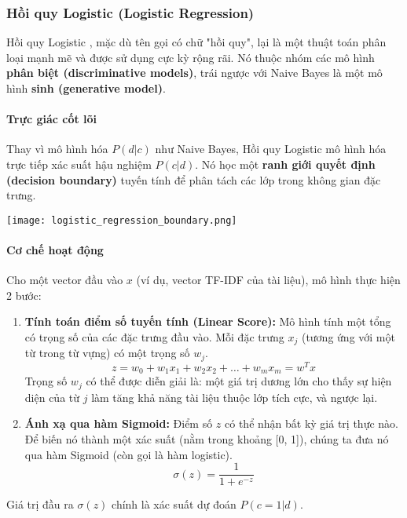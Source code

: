 \subsubsection{Hồi quy Logistic (Logistic Regression)}
Hồi quy Logistic \cite{hosmer2013applied}, mặc dù tên gọi có chữ "hồi quy", lại là một thuật toán phân loại mạnh mẽ và được sử dụng cực kỳ rộng rãi. Nó thuộc nhóm các mô hình \textbf{phân biệt (discriminative models)}, trái ngược với Naive Bayes là một mô hình \textbf{sinh (generative model)}.

\paragraph{Trực giác cốt lõi}
Thay vì mô hình hóa $P(d|c)$ như Naive Bayes, Hồi quy Logistic mô hình hóa trực tiếp xác suất hậu nghiệm $P(c|d)$. Nó học một \textbf{ranh giới quyết định (decision boundary)} tuyến tính để phân tách các lớp trong không gian đặc trưng.

\begin{center}
    \texttt{[image: logistic\_regression\_boundary.png]}
    \label{fig:logistic_regression_boundary}
\end{center}

\paragraph{Cơ chế hoạt động}
Cho một vector đầu vào $x$ (ví dụ, vector TF-IDF của tài liệu), mô hình thực hiện 2 bước:
\begin{enumerate}
    \item \textbf{Tính toán điểm số tuyến tính (Linear Score):} Mô hình tính một tổng có trọng số của các đặc trưng đầu vào. Mỗi đặc trưng $x_j$ (tương ứng với một từ trong từ vựng) có một trọng số $w_j$.
    $$ z = w_0 + w_1 x_1 + w_2 x_2 + \dots + w_m x_m = w^T x $$
    Trọng số $w_j$ có thể được diễn giải là: một giá trị dương lớn cho thấy sự hiện diện của từ $j$ làm tăng khả năng tài liệu thuộc lớp tích cực, và ngược lại.
    \item \textbf{Ánh xạ qua hàm Sigmoid:} Điểm số $z$ có thể nhận bất kỳ giá trị thực nào. Để biến nó thành một xác suất (nằm trong khoảng [0, 1]), chúng ta đưa nó qua hàm Sigmoid (còn gọi là hàm logistic).
    $$ \sigma(z) = \frac{1}{1 + e^{-z}} $$
\end{enumerate}
Giá trị đầu ra $\sigma(z)$ chính là xác suất dự đoán $P(c=1|d)$.
